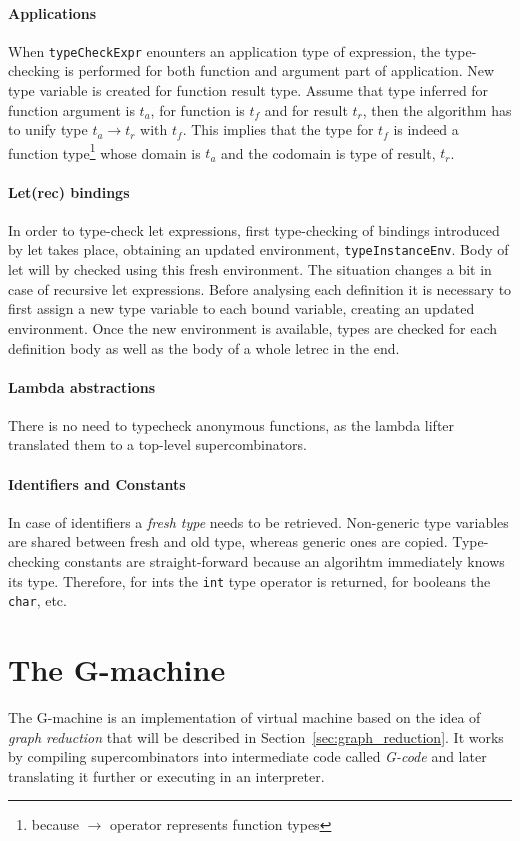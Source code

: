 \documentclass[12pt,a4paper]{report}
\begin{document}
\subsubsection{Applications}
When \texttt{typeCheckExpr} enounters an application type of expression, the
type-checking is performed for both function and argument part of application.
New type variable is created for function result type. Assume that type
inferred for function argument is $t_a$, for function is $t_f$ and for result
$t_r$, then the algorithm has to unify type $t_a \rightarrow
t_r$ with $t_f$. This implies that the type for $t_f$ is indeed a function
type\footnote{because $\rightarrow$ operator represents function types} whose
domain is $t_a$ and the codomain is type of result, $t_r$.

\subsubsection{Let(rec) bindings}
In order to type-check let expressions, first type-checking of
bindings introduced by let takes place, obtaining an updated
environment, \texttt{typeInstanceEnv}. Body of let will by checked
using this fresh environment. The situation changes a bit in case of recursive
let expressions. Before analysing each definition it is necessary to
first assign a new type variable to each bound variable, creating an updated
environment. Once the new environment is available, types are checked for each
definition body as well as the body of a whole letrec in the end.

\subsubsection{Lambda abstractions}
There is no need to typecheck anonymous functions, as the lambda lifter
translated them to a top-level supercombinators.

\subsubsection{Identifiers and Constants}
In case of identifiers a \textit{fresh type} needs to be retrieved. Non-generic
type variables are shared between fresh and old type, whereas generic ones are
copied. Type-checking constants are straight-forward because an algorihtm
immediately knows its type. Therefore, for ints the \texttt{int} type operator
is returned, for booleans the \texttt{char}, etc.

\chapter{The G-machine}
The G-machine is an implementation of virtual machine based on the idea of
\textit{graph reduction} that will be described in
Section~\ref{sec:graph_reduction}. It works by compiling supercombinators into
intermediate code called \textit{G-code} and later translating it further or
executing in an interpreter.
\end{document}
